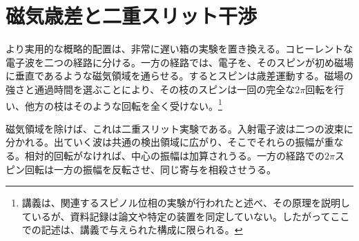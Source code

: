 \section{磁気歳差と二重スリット干渉}

より実用的な概略的配置は、非常に遅い箱の実験を置き換える。コヒーレントな電子波を二つの経路に分ける。一方の経路では、電子を、そのスピンが初め磁場に垂直であるような磁気領域を通らせる。するとスピンは歳差運動する。磁場の強さと通過時間を選ぶことにより、その枝のスピンは一回の完全な\(2\pi\)回転を行い、他方の枝はそのような回転を全く受けない。\footnote{講義は、関連するスピノル位相の実験が行われたと述べ、その原理を説明しているが、資料記録は論文や特定の装置を同定していない。したがってここでの記述は、講義で与えられた構成に限られる。}

\begin{classroomqa}
\end{classroomqa}

\begin{classroomqa}
\end{classroomqa}

磁気領域を除けば、これは二重スリット実験である。入射電子波は二つの波束に分かれる。出ていく波は共通の検出領域に広がり、そこでそれらの振幅が重なる。相対的回転がなければ、中心の振幅は加算されうる。一方の経路での\(2\pi\)スピン回転は一方の振幅を反転させ、同じ寄与を相殺させうる。

\begin{classroomqa}
\end{classroomqa}

\begin{classroomqa}
\end{classroomqa}

